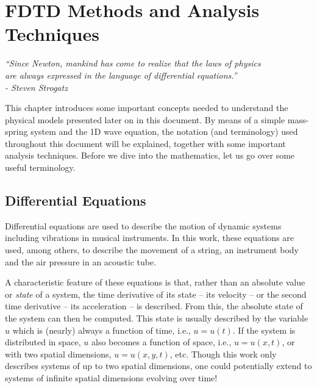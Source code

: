 \chapter{FDTD Methods and Analysis Techniques}\label{ch:FDTD}

\begin{flushright}{\it
``Since Newton, mankind has come to realize that the laws of physics\\
are always expressed in the language of differential equations.''\\
- Steven Strogatz\\
\SWcomment[(https://youtu.be/O85OWBJ2ayo?t=44)]} 
\end{flushright}
%
This chapter introduces some important concepts needed to understand the physical models presented later on in this document. 
By means of a simple mass-spring system and the 1D wave equation, the notation (and terminology) used throughout this document will be explained, together with some important analysis techniques. 
Before we dive into the mathematics, let us go over some useful terminology.

\section{Differential Equations}
Differential equations are used to describe the motion of dynamic systems including vibrations in musical instruments. In this work, these equations are used, among others, to describe the movement of a string, an instrument body and the air pressure in an acoustic tube.

A characteristic feature of these equations is that, rather than an absolute value or \textit{state} of a system, the time derivative of its state -- its velocity -- or the second time derivative -- its acceleration -- is described. From this, the absolute state of the system can then be computed.
%
This state is usually described by the variable $u$ which is (nearly) always a function of time, i.e., $u=u(t)$. If the system is distributed in space, $u$ also becomes a function of space, i.e., $u = u(x,t)$, or with two spatial dimensions, $u = u(x,y,t)$, etc. Though this work only describes systems of up to two spatial dimensions, one could potentially extend to systems of infinite spatial dimensions evolving over time! 

